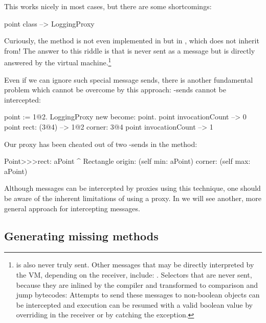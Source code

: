 \documentclass[a4paper,10pt,twoside]{book}
\begin{document}
This works nicely in most cases, but there are some shortcomings:
\begin{code}{}
point class --> LoggingProxy
\end{code}
Curiously, the method  is not even implemented in  but in , which  does not inherit from!
The answer to this riddle is that  is never sent as a message but is directly answered by the virtual machine.\footnote{ is also never truly sent.
Other messages that may be directly interpreted by the VM, depending on the receiver, include:
\ct{+- < > <= >= = ~= * / \ ==}
.
Selectors that are never sent, because they are inlined by the compiler and transformed to comparison and jump bytecodes:
Attempts to send these messages to non-boolean objects can be intercepted and execution can be resumed with a valid boolean value by overriding  in the receiver or by catching the  exception.
}%

Even if we can ignore such special message sends, there is another fundamental problem which cannot be overcome by this approach: \self-sends cannot be intercepted:
\begin{code}{}
point := 1@2.
LoggingProxy new become: point.
point invocationCount --> 0
point rect: (3@4)        --> 1@2 corner: 3@4
point invocationCount --> 1
\end{code}

Our proxy has been cheated out of two \self-sends in the  method:
\begin{code}{}
Point>>>rect: aPoint 
	^ Rectangle  origin: (self min: aPoint) corner: (self max: aPoint)
\end{code}

Although messages can be intercepted by proxies using this technique, one should be aware of the inherent limitations of using a proxy.  In  we will see another, more general approach for intercepting messages.

\subsection{Generating missing methods}
\end{document}
